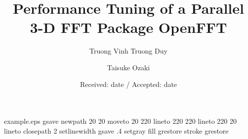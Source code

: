 \begin{filecontents*}{example.eps}
gsave
newpath
  20 20 moveto
  20 220 lineto
  220 220 lineto
  220 20 lineto
closepath
2 setlinewidth
gsave
  .4 setgray fill
grestore
stroke
grestore
\end{filecontents*}
\RequirePackage{fix-cm}
\documentclass[smallextended]{svjour3}       \smartqed  \usepackage{amssymb}
\usepackage{amsmath}
\usepackage{comment}
\usepackage{captcont} 
\usepackage{graphicx}
\usepackage{caption}
\usepackage{subcaption}
\captionsetup{compatibility=false}
\usepackage{array}
\usepackage{epstopdf}
\usepackage{algorithm}
\usepackage[noend]{algpseudocode}

\makeatletter
\def\BState{\State\hskip-\ALG@thistlm}
\makeatother


\title{Performance Tuning of a Parallel 3-D FFT Package OpenFFT }



\author{Truong Vinh Truong Duy \and Taisuke Ozaki }




\date{Received: date / Accepted: date}



\maketitle

\begin{abstract}
The fast Fourier transform (FFT) is a primitive kernel in numerous fields of science and engineering. OpenFFT is an open-source parallel package for 3-D FFTs, built on a communication-optimal domain decomposition method for achieving minimal volume of communication. 
In this paper, we analyze and tune the performance of OpenFFT, paying a particular attention to tuning of communication that dominates the run time of large-scale calculations. We first analyze its performance on different machines for an understanding of the behaviors of the package and machines. Based on the performance analysis, we develop six communication methods for performing communication with the aim of covering varied calculation scales on a variety of computational platforms. OpenFFT is then augmented with an auto-tuning of communication to select the best method in run time depending on their performance. Numerical results demonstrate that the optimized OpenFFT is able to deliver relatively good performance in comparison with other state-of-the-art packages at different computational scales on a number of parallel machines. 


\end{abstract}


